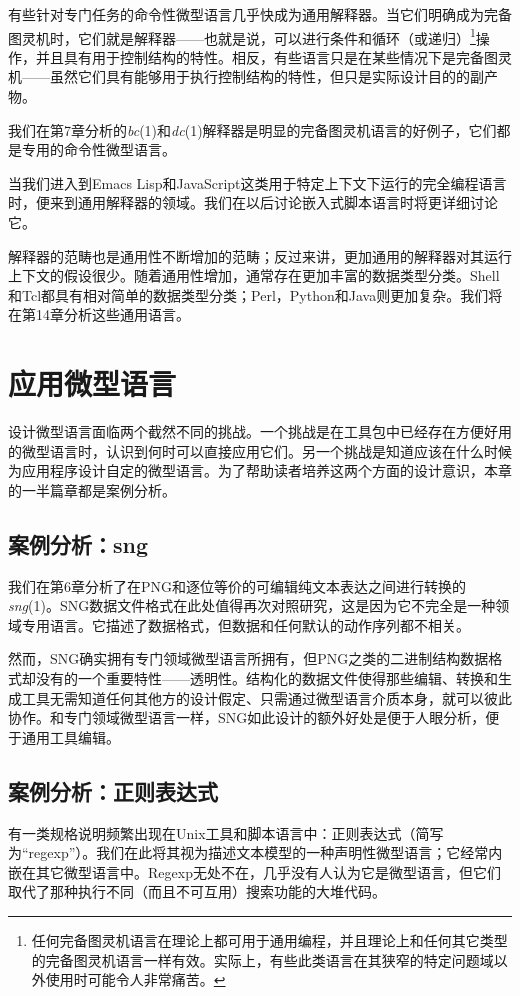 \documentclass[12pt,oneside]{ctexbook}
\begin{document}
\begin{common-format}
有些针对专门任务的命令性微型语言几乎快成为通用解释器。当它们明确成为完备图灵机时，它们就是解释器——也就是说，可以进行条件和循环（或递归）\footnote{任何完备图灵机语言在理论上都可用于通用编程，并且理论上和任何其它类型的完备图灵机语言一样有效。实际上，有些此类语言在其狭窄的特定问题域以外使用时可能令人非常痛苦。}操作，并且具有用于控制结构的特性。相反，有些语言只是在某些情况下是完备图灵机——虽然它们具有能够用于执行控制结构的特性，但只是实际设计目的的副产物。

我们在第7章分析的\textit{bc}(1)和\textit{dc}(1)解释器是明显的完备图灵机语言的好例子，它们都是专用的命令性微型语言。

当我们进入到Emacs Lisp和JavaScript这类用于特定上下文下运行的完全编程语言时，便来到通用解释器的领域。我们在以后讨论嵌入式脚本语言时将更详细讨论它。

解释器的范畴也是通用性不断增加的范畴；反过来讲，更加通用的解释器对其运行上下文的假设很少。随着通用性增加，通常存在更加丰富的数据类型分类。Shell和Tcl都具有相对简单的数据类型分类；Perl，Python和Java则更加复杂。我们将在第14章分析这些通用语言。


\section{应用微型语言}
设计微型语言面临两个截然不同的挑战。一个挑战是在工具包中已经存在方便好用的微型语言时，认识到何时可以直接应用它们。另一个挑战是知道应该在什么时候为应用程序设计自定的微型语言。为了帮助读者培养这两个方面的设计意识，本章的一半篇章都是案例分析。

\subsection{案例分析：sng}
我们在第6章分析了在PNG和逐位等价的可编辑纯文本表达之间进行转换的\textit{sng}(1)。SNG数据文件格式在此处值得再次对照研究，这是因为它不完全是一种领域专用语言。它描述了数据格式，但数据和任何默认的动作序列都不相关。

然而，SNG确实拥有专门领域微型语言所拥有，但PNG之类的二进制结构数据格式却没有的一个重要特性——透明性。结构化的数据文件使得那些编辑、转换和生成工具无需知道任何其他方的设计假定、只需通过微型语言介质本身，就可以彼此协作。和专门领域微型语言一样，SNG如此设计的额外好处是便于人眼分析，便于通用工具编辑。

\subsection{案例分析：正则表达式}
有一类规格说明频繁出现在Unix工具和脚本语言中：正则表达式（简写为“regexp”）。我们在此将其视为描述文本模型的一种声明性微型语言；它经常内嵌在其它微型语言中。Regexp无处不在，几乎没有人认为它是微型语言，但它们取代了那种执行不同（而且不可互用）搜索功能的大堆代码。


\end{common-format}
\end{document}
